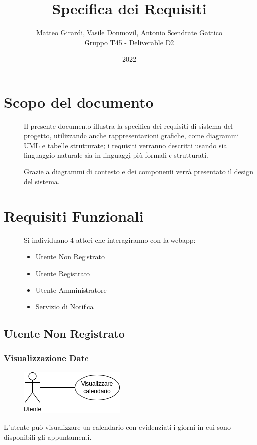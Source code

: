 \documentclass{article}
\title{\textbf{\Huge Specifica dei Requisiti}}
\author{Matteo Girardi, Vasile Donmovil, Antonio Scendrate Gattico \\ Gruppo T45 - Deliverable D2}
\date{2022}
\begin{document}
\maketitle

\clearpage
\tableofcontents
\clearpage

\section{Scopo del documento}
\begin{description}
	\item[] Il presente documento illustra la specifica dei requisiti di sistema del progetto, utilizzando anche rappresentazioni grafiche, come diagrammi UML e tabelle strutturate; i requisiti verranno descritti usando sia linguaggio naturale sia in linguaggi più formali e strutturati.
	\item[] Grazie a diagrammi di contesto e dei componenti verrà presentato il design del sistema.
\end{description}
\clearpage

\section{Requisiti Funzionali}
\begin{description}
	\item[] Si individuano 4 attori che interagiranno con la webapp:
	\begin{itemize}
		\item  Utente Non Registrato
		\item  Utente Registrato
		\item  Utente Amministratore
		\item  Servizio di Notifica
	\end{itemize}
\end{description}


\subsection{Utente Non Registrato}
\renewcommand\thesubsubsection{RF \arabic{subsubsection}}

\subsubsection{Visualizzazione Date}\label{rf_1}
\begin{description}
	    
	\begin{figure}[htp]
		\centering
		\includegraphics[]{rf1.png}
	\end{figure}
	     
	\item L'utente può visualizzare un calendario con evidenziati i giorni in cui sono disponibili gli appuntamenti. 
\end{description}
\end{document}
